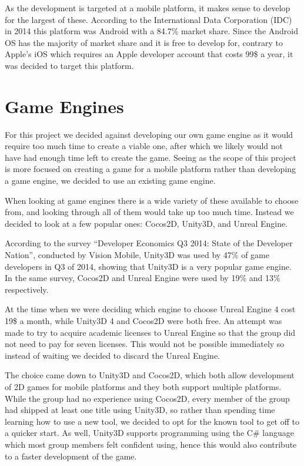 As the development is targeted at a mobile platform, it makes sense to develop for the largest of these. 
According to the International Data Corporation (IDC) in 2014 this platform was Android with a 84.7\% market share\cite{marketshare}.
Since the Android OS has the majority of market share and it is free to develop for, contrary to Apple's iOS which requires an Apple developer account that costs 99\$ a year\cite{appledevprogram}, it was decided to target this platform.


\section{Game Engines}
For this project we decided against developing our own game engine as it would require too much time to create a viable one, after which we likely would not have had enough time left to create the game. 
Seeing as the scope of this project is more focused on creating a game for a mobile platform rather than developing a game engine, we decided to use an existing game engine.

When looking at game engines there is a wide variety of these available to choose from, and looking through all of them would take up too much time. 
Instead we decided to look at a few popular ones: Cocos2D, Unity3D, and Unreal Engine.

According to the survey ``Developer Economics Q3 2014: State of the Developer Nation''\cite{visionmobile-survey}, conducted by Vision Mobile\cite{visionmobile}, Unity3D was used by 47\% of game developers in Q3 of 2014, showing that Unity3D is a very popular game engine. 
In the same survey, Cocos2D and Unreal Engine were used by 19\% and 13\% respectively.

At the time when we were deciding which engine to choose Unreal Engine 4 cost 19\$ a month\cite{unrealFree}, while Unity3D 4 and Cocos2D were both free. 
An attempt was made to try to acquire academic licenses to Unreal Engine so that the group did not need to pay for seven licenses. 
This would not be possible immediately so instead of waiting we decided to discard the Unreal Engine.

The choice came down to Unity3D and Cocos2D, which both allow development of 2D games for mobile platforms and they both support multiple platforms. 
While the group had no experience using Cocos2D, every member of the group had shipped at least one title using Unity3D, so rather than spending time learning how to use a new tool, we decided to opt for the known tool to get off to a quicker start. 
As well, Unity3D supports programming using the C\# language which most group members felt confident using, hence this would also contribute to a faster development of the game.